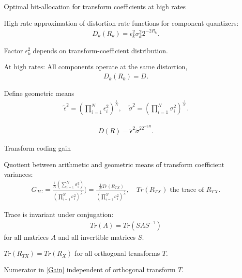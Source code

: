 \begin{frame}{Optimal bit-allocation for transform coefficients at high rates}
\bit
\item High-rate approximation of distortion-rate functions for component quantizers:
\begin{align*}
D_k(R_k)=\epsilon_k^2\sigma_k^2 2^{-2R_k}.
\end{align*}
\item Factor $\epsilon_k^2$ depends on transform-coefficient distribution. 
\item At high rates: All components operate at the same distortion,
\begin{align*}
D_k(R_k) =D.
\end{align*}
\item Define geometric means 
\begin{align*}
\tilde{\epsilon}^2=\left(\prod_{i=1}^N\epsilon_i^2\right)^{\frac{1}{N}}, \quad \tilde{\sigma}^2=\left(\prod_{i=1}^N\sigma_i^2\right)^{\frac{1}{N}}.
\end{align*}
\item[\iarrow]
\begin{align}\label{DRHighRates}
D(R) = \tilde{\epsilon}^2\tilde{\sigma}^22^{-2R}.
\end{align}
\eit
\end{frame}



\begin{frame}{Transform coding gain}
\bit
\item[] Quotient between arithmetic and geometric means of transform coefficient variances:
\begin{align}\label{Gain}
G_{TC}=\frac{\frac{1}{N}\left(\sum_{i=1}^{N}\sigma_i^2\right)}{\left(\prod_{i=1}^N\sigma_i^2\right)^{\frac{1}{N}}})=\frac{\frac{1}{N}Tr(R_{TX})}{\left(\prod_{i=1}^N\sigma_i^2\right)^{\frac{1}{N}}}, \quad \text{$Tr(R_{TX})$ the trace of $R_{TX}$}.
\end{align}
\eit
\bit
\item Trace is invariant under conjugation: 
\begin{align*}
Tr(A)=Tr(SAS^{-1})
\end{align*}
 for all matrices $A$ and all invertible matrices $S$. 
\item[\iarrow] $Tr(R_{TX})=Tr(R_X)$ for all orthogonal transforms $T$. 
\item [\iarrow] Numerator in \eqref{Gain} independent of orthogonal transform $T$. 
\eit
\end{frame}


